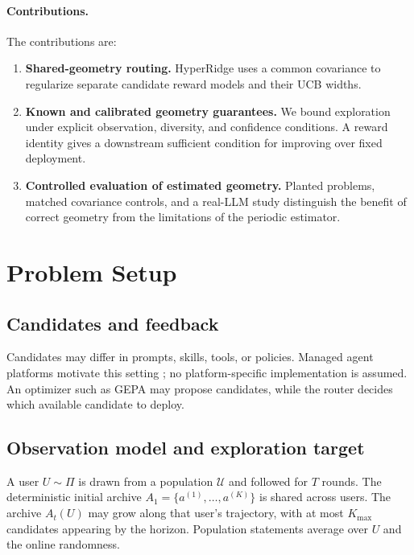 \documentclass{article} %
\begin{document}
\paragraph{Contributions.}
The contributions are:
\begin{enumerate}
\item \textbf{Shared-geometry routing.} HyperRidge uses a common covariance
to regularize separate candidate reward models and their UCB widths.
\item \textbf{Known and calibrated geometry guarantees.} We bound exploration
under explicit observation, diversity, and confidence
conditions. A reward identity gives a downstream sufficient condition for
improving over fixed deployment.
\item \textbf{Controlled evaluation of estimated geometry.} Planted problems,
matched covariance controls, and a real-LLM study distinguish the benefit of
correct geometry from the limitations of the periodic estimator.
\end{enumerate}

\section{Problem Setup}
\label{sec:background}

\subsection{Candidates and feedback}

\label{sec:method-plain}
Candidates may differ in prompts, skills, tools, or policies. Managed agent
platforms motivate this setting
\citep{microsoft2026foundryagents,aws2026agentcore}; no platform-specific
implementation is assumed. An optimizer such as GEPA
\citep{agrawal2025geparp} may propose candidates, while the router decides
which available candidate to deploy.

\subsection{Observation model and exploration target}

\label{sec:method-notation}
A user $U\sim\Pi$ is drawn from a population $\mathcal U$ and followed for
$T$ rounds. The deterministic initial archive
$A_1=\{a^{(1)},\ldots,a^{(K)}\}$ is shared across users. The archive
$A_t(U)$ may grow along that user's trajectory, with at most $K_{\max}$
candidates appearing by the horizon. Population statements average over
$U$ and the online randomness.
\end{document}
